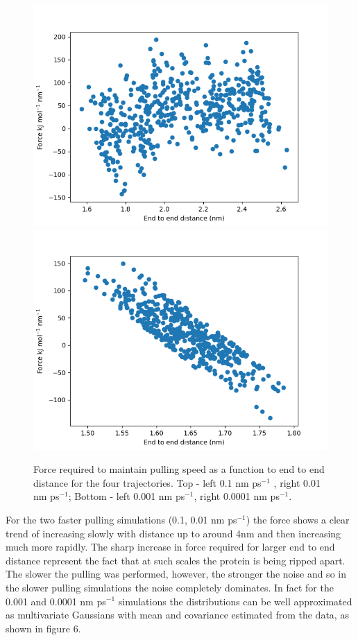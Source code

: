 \documentclass[12pt, onecolumn]{revtex4}    %
\begin{document}
\begin{figure}[h!]
\includegraphics[scale=0.4]{FD0_001}
\includegraphics[scale=0.4]{FD0_0001}
\caption{Force required to maintain pulling speed as a function to end to end distance for the four trajectories.  Top - left 0.1 nm ps$^{-1}$ , right 0.01 nm ps$^{-1}$; Bottom - left 0.001 nm ps$^{-1}$, right 0.0001 nm ps$^{-1}$.}
\end{figure}

For the two faster pulling simulations (0.1, 0.01 nm ps$^{-1}$) the force shows a clear trend of increasing slowly with distance up to around 4nm and then increasing much more rapidly.  The sharp increase in force required for larger end to end distance represent the fact that at such scales the protein is being ripped apart.  The slower the pulling was performed, however, the stronger the noise and so in the slower pulling simulations the noise completely dominates.  In fact for the 0.001 and 0.0001 nm ps$^{-1}$ simulations the distributions can be well approximated as multivariate Gaussians with mean and covariance estimated from the data, as shown in figure 6.\\ 
 
\end{document}
